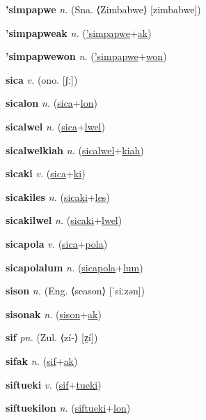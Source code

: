 \textbf{\hypertarget{'simpapwe}{'simpapwe}} \textit{n.} (Sna. ⟨Zimbabwe⟩ [zimbabwe])


\textbf{\hypertarget{'simpapweak}{'simpapweak}} \textit{n.} (\hyperlink{'simpapwe}{'simpapwe}+\allowbreak \hyperlink{ak}{ak})


\textbf{\hypertarget{'simpapwewon}{'simpapwewon}} \textit{n.} (\hyperlink{'simpapwe}{'simpapwe}+\allowbreak \hyperlink{won}{won})


\textbf{\hypertarget{sica}{sica}} \textit{v.} (ono. [ʃː])


\textbf{\hypertarget{sicalon}{sicalon}} \textit{n.} (\hyperlink{sica}{sica}+\allowbreak \hyperlink{lon}{lon})


\textbf{\hypertarget{sicalwel}{sicalwel}} \textit{n.} (\hyperlink{sica}{sica}+\allowbreak \hyperlink{lwel}{lwel})


\textbf{\hypertarget{sicalwelkiah}{sicalwelkiah}} \textit{n.} (\hyperlink{sicalwel}{sicalwel}+\allowbreak \hyperlink{kiah}{kiah})


\textbf{\hypertarget{sicaki}{sicaki}} \textit{v.} (\hyperlink{sica}{sica}+\allowbreak \hyperlink{ki}{ki})


\textbf{\hypertarget{sicakiles}{sicakiles}} \textit{n.} (\hyperlink{sicaki}{sicaki}+\allowbreak \hyperlink{les}{les})


\textbf{\hypertarget{sicakilwel}{sicakilwel}} \textit{n.} (\hyperlink{sicaki}{sicaki}+\allowbreak \hyperlink{lwel}{lwel})


\textbf{\hypertarget{sicapola}{sicapola}} \textit{v.} (\hyperlink{sica}{sica}+\allowbreak \hyperlink{pola}{pola})


\textbf{\hypertarget{sicapolalum}{sicapolalum}} \textit{n.} (\hyperlink{sicapola}{sicapola}+\allowbreak \hyperlink{lum}{lum})


\textbf{\hypertarget{sison}{sison}} \textit{n.} (Eng. ⟨season⟩ [ˈsiːzən])


\textbf{\hypertarget{sisonak}{sisonak}} \textit{n.} (\hyperlink{sison}{sison}+\allowbreak \hyperlink{ak}{ak})


\textbf{\hypertarget{sif}{sif}} \textit{pn.} (Zul. ⟨zí-⟩ [z̤í])


\textbf{\hypertarget{sifak}{sifak}} \textit{n.} (\hyperlink{sif}{sif}+\allowbreak \hyperlink{ak}{ak})


\textbf{\hypertarget{siftueki}{siftueki}} \textit{v.} (\hyperlink{sif}{sif}+\allowbreak \hyperlink{tueki}{tueki})


\textbf{\hypertarget{siftuekilon}{siftuekilon}} \textit{n.} (\hyperlink{siftueki}{siftueki}+\allowbreak \hyperlink{lon}{lon})


